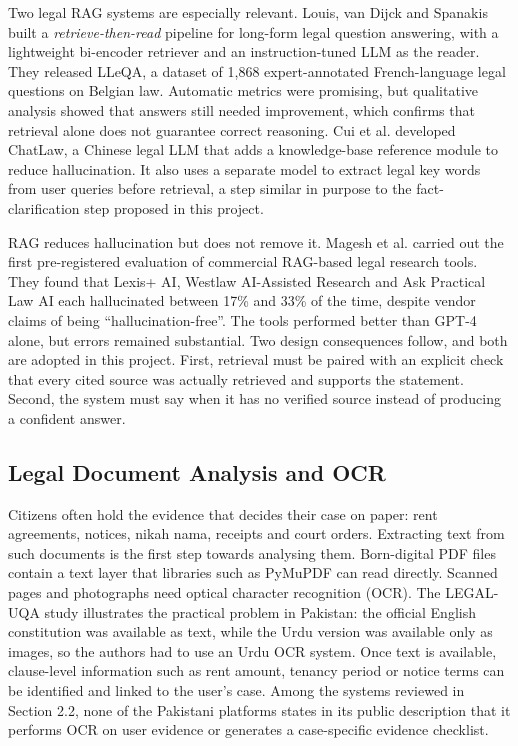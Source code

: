 Two legal RAG systems are especially relevant. Louis, van Dijck and Spanakis \cite{r16} built a \emph{retrieve-then-read} pipeline for long-form legal question answering, with a lightweight bi-encoder retriever and an instruction-tuned LLM as the reader. They released LLeQA, a dataset of 1,868 expert-annotated French-language legal questions on Belgian law. Automatic metrics were promising, but qualitative analysis showed that answers still needed improvement, which confirms that retrieval alone does not guarantee correct reasoning. Cui et al. \cite{r17} developed ChatLaw, a Chinese legal LLM that adds a knowledge-base reference module to reduce hallucination. It also uses a separate model to extract legal key words from user queries before retrieval, a step similar in purpose to the fact-clarification step proposed in this project.

RAG reduces hallucination but does not remove it. Magesh et al. \cite{r9} carried out the first pre-registered evaluation of commercial RAG-based legal research tools. They found that Lexis+ AI, Westlaw AI-Assisted Research and Ask Practical Law AI each hallucinated between 17\% and 33\% of the time, despite vendor claims of being ``hallucination-free''. The tools performed better than GPT-4 alone, but errors remained substantial. Two design consequences follow, and both are adopted in this project. First, retrieval must be paired with an explicit check that every cited source was actually retrieved and supports the statement. Second, the system must say when it has no verified source instead of producing a confident answer.

\subsection{Legal Document Analysis and OCR}

Citizens often hold the evidence that decides their case on paper: rent agreements, notices, nikah nama, receipts and court orders. Extracting text from such documents is the first step towards analysing them. Born-digital PDF files contain a text layer that libraries such as PyMuPDF can read directly. Scanned pages and photographs need optical character recognition (OCR). The LEGAL-UQA study \cite{r19} illustrates the practical problem in Pakistan: the official English constitution was available as text, while the Urdu version was available only as images, so the authors had to use an Urdu OCR system. Once text is available, clause-level information such as rent amount, tenancy period or notice terms can be identified and linked to the user's case. Among the systems reviewed in Section 2.2, none of the Pakistani platforms states in its public description that it performs OCR on user evidence or generates a case-specific evidence checklist.

